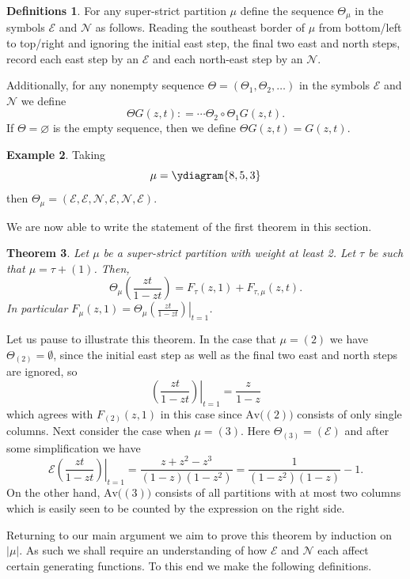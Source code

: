 \documentclass{article}
\theoremstyle{plain}
\newtheorem{theorem}{Theorem}[section]
\theoremstyle{definition}
\newtheorem{definitions}[theorem]{Definitions}
\newtheorem{example}[theorem]{Example}
\newcommand{\Av}{\text{Av}}
\newcommand{\N}{\mathcal{N}}
\newcommand{\E}{\mathcal{E}}
\begin{document}
\begin{definitions}
For any super-strict partition $\mu$ define the sequence $\Theta_\mu$ in the symbols $\E$ and $\N$ as follows.  Reading the southeast border of $\mu$ from bottom/left to top/right and ignoring the initial east step, the final two east and north steps, record each east step by an $\E$ and each north-east step by an $\N$.  

Additionally, for any nonempty sequence $\Theta=(\Theta_1,\Theta_2,\ldots)$ in the symbols $\E$ and $\N$ we define
$$\Theta G(z,t): = \cdots \Theta_2\circ \Theta_1 G(z,t).$$
If $\Theta = \varnothing$ is the empty sequence, then we define $\Theta G(z,t) = G(z,t)$.
\end{definitions}

\begin{example}
Taking
$$\mu = \ydiagram{8,5,3}$$ 
then $\Theta_\mu = (\E, \E, \N,\E,\N,\E)$.
\end{example}


We are now able to write the statement of the first theorem in this section.  

\begin{theorem}\label{thm:F}
Let $\mu$ be a super-strict partition with weight at least 2.  Let $\tau$ be such that $\mu=\tau+(1)$.  Then,
$$\Theta_\mu\left(\frac{zt}{1-zt}\right) =F_{\tau}(z,1) + F_{\tau,\mu}(z,t).$$
In particular $F_\mu(z,1) = \left.\Theta_\mu\left(\frac{zt}{1-zt}\right)\right|_{t=1}$.  
\end{theorem}

Let us pause to illustrate this theorem.  In the case that $\mu=(2)$ we have $\Theta_{(2)} = \emptyset$, since the initial east step as well as the final two east and north steps are ignored, so 
$$\left.\left(\frac{zt}{1-zt}\right)\right|_{t=1} = \frac{z}{1-z}$$
which agrees with $F_{(2)}(z,1)$ in this case since $\Av\big((2)\big)$ consists of only single columns.   Next consider the case when $\mu = (3)$.  Here $\Theta_{(3)} = (\E)$ and  after some simplification we have
$$\E \left.\left(\frac{zt}{1-zt}\right)\right|_{t=1} = \frac{z+z^2 - z^3}{(1-z)(1-z^2)}= \frac{1}{(1-z^2)(1-z)}-1.$$
On the other hand, $\Av\big((3)\big)$ consists of all partitions with at most two columns which is easily seen to be counted by the expression on the right side.  

Returning to our main argument we aim to prove this theorem by induction on $|\mu|$.  As such  we shall require an understanding of how $\E$ and $\N$ each affect certain generating functions.  To this end we make the following definitions.
\end{document}
